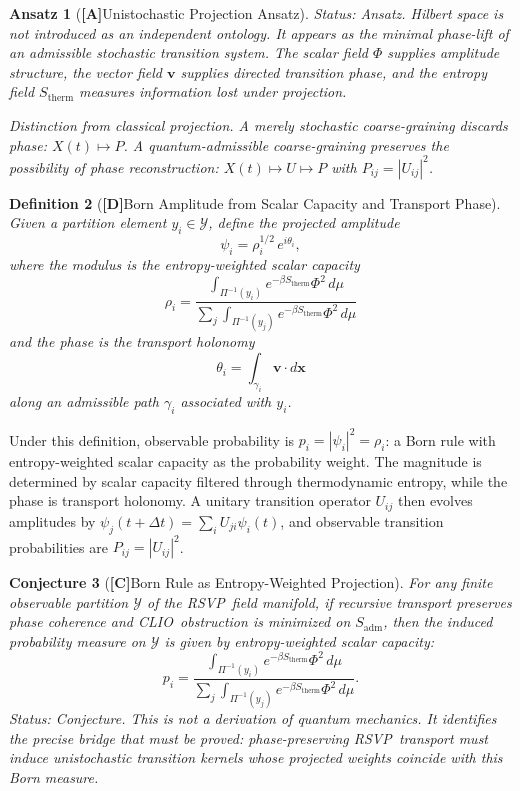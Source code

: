 \documentclass[12pt,a4paper]{article}
\newcommand{\claimD}{\textbf{[D]}\;}
\newcommand{\claimA}{\textbf{[A]}\;}
\newcommand{\claimC}{\textbf{[C]}\;}
\newtheorem{defn}{Definition}[section]
\newtheorem{appansatz}[defn]{Ansatz}
\newtheorem{appconj}[defn]{Conjecture}
\newcommand{\RSVP}{\textrm{RSVP}}
\newcommand{\CLIO}{\textrm{CLIO}}
\begin{document}
\begin{appansatz}[\claimA Unistochastic Projection Ansatz]
\emph{Status: Ansatz.} Hilbert space is not introduced as an independent
ontology. It appears as the minimal phase-lift of an admissible stochastic
transition system. The scalar field $\Phi$ supplies amplitude structure, the
vector field $\mathbf{v}$ supplies directed transition phase, and the entropy
field $S_\mathrm{therm}$ measures information lost under projection.

\emph{Distinction from classical projection.} A merely stochastic coarse-graining
discards phase: $X(t)\mapsto P$. A quantum-admissible coarse-graining preserves
the possibility of phase reconstruction: $X(t)\mapsto U\mapsto P$ with
$P_{ij}=|U_{ij}|^2$.
\end{appansatz}

\begin{defn}[\claimD Born Amplitude from Scalar Capacity and Transport Phase]
Given a partition element $y_i\in\mathcal{Y}$, define the projected amplitude
\[
\psi_i
= \rho_i^{1/2}\,e^{i\theta_i},
\]
where the modulus is the entropy-weighted scalar capacity
\[
\rho_i
= \frac{\displaystyle\int_{\Pi^{-1}(y_i)} e^{-\beta S_\mathrm{therm}}\Phi^2\,d\mu}
         {\displaystyle\sum_j\int_{\Pi^{-1}(y_j)} e^{-\beta S_\mathrm{therm}}\Phi^2\,d\mu}
\]
and the phase is the transport holonomy
\[
\theta_i = \int_{\gamma_i}\mathbf{v}\cdot d\mathbf{x}
\]
along an admissible path $\gamma_i$ associated with $y_i$.
\end{defn}

Under this definition, observable probability is $p_i=|\psi_i|^2=\rho_i$: a
Born rule with entropy-weighted scalar capacity as the probability weight. The
magnitude is determined by scalar capacity filtered through thermodynamic
entropy, while the phase is transport holonomy. A unitary transition operator
$U_{ij}$ then evolves amplitudes by $\psi_j(t+\Delta t)=\sum_i U_{ji}\psi_i(t)$,
and observable transition probabilities are $P_{ij}=|U_{ij}|^2$.

\begin{appconj}[\claimC Born Rule as Entropy-Weighted Projection]
For any finite observable partition $\mathcal{Y}$ of the \RSVP\ field manifold,
if recursive transport preserves phase coherence and \CLIO\ obstruction is
minimized on $S_\mathrm{adm}$, then the induced probability measure on
$\mathcal{Y}$ is given by entropy-weighted scalar capacity:
\[
p_i
= \frac{\displaystyle\int_{\Pi^{-1}(y_i)} e^{-\beta S_\mathrm{therm}}\Phi^2\,d\mu}
         {\displaystyle\sum_j\int_{\Pi^{-1}(y_j)} e^{-\beta S_\mathrm{therm}}\Phi^2\,d\mu}.
\]
\emph{Status: Conjecture.} This is not a derivation of quantum mechanics. It
identifies the precise bridge that must be proved: phase-preserving \RSVP\
transport must induce unistochastic transition kernels whose projected weights
coincide with this Born measure.
\end{appconj}
\end{document}
